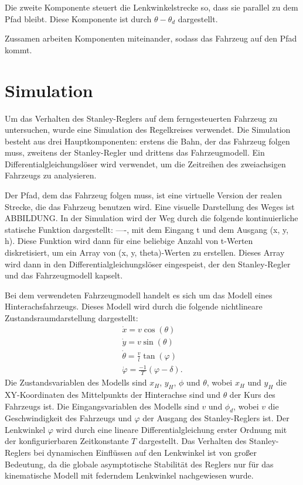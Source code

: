 \documentclass[arbeit=studie,oneside,BCOR=12mm]{ArbeitRST}
\begin{document}
Die zweite Komponente steuert die Lenkwinkelstrecke so, dass sie parallel zu
dem Pfad bleibt. Diese Komponente ist durch $\theta - \theta_d$ dargestellt.

Zussamen arbeiten Komponenten miteinander, sodass das Fahrzeug auf den Pfad
kommt. 







\section{Simulation}


Um das Verhalten des Stanley-Reglers auf dem ferngesteuerten Fahrzeug zu 
untersuchen, wurde eine Simulation des Regelkreises verwendet.
Die Simulation besteht aus drei Hauptkomponenten: erstens die Bahn, der das 
Fahrzeug folgen muss, zweitens der Stanley-Regler und drittens das 
Fahrzeugmodell. Ein Differentialgleichungslöser wird verwendet, um die 
Zeitreihen des zweiachsigen Fahrzeugs zu analysieren. 

Der Pfad, dem das Fahrzeug folgen muss, ist eine virtuelle Version der realen 
Strecke, die das Fahrzeug benutzen wird. Eine visuelle Darstellung des Weges 
ist ABBILDUNG. In der Simulation wird der Weg durch die folgende kontinuierliche
statische Funktion dargestellt:
----, 
mit dem Eingang t und dem Ausgang (x, y, h). Diese Funktion wird dann für eine 
beliebige Anzahl von t-Werten diskretisiert, um ein Array von 
(x, y, theta)-Werten zu erstellen. Dieses Array wird dann in den 
Differentialgleichungslöser eingespeist, der den Stanley-Regler und das 
Fahrzeugmodell kapselt. 

Bei dem verwendeten Fahrzeugmodell handelt es sich um das Modell eines 
Hinterachsfahrzeugs. Dieses Modell wird durch die folgende nichtlineare 
Zustandsraumdarstellung dargestellt:
\begin{gather}
    \dot{x} = v \cos(\theta) \\
    \dot{y} = v \sin(\theta) \\
    \dot{\theta} = \frac{v}{l}\tan(\varphi) \\
    \dot{\varphi} = \frac{-1}{T}\left(\varphi - \delta\right).
\end{gather}
Die Zustandsvariablen des Modells sind $x_H$, $y_H$, $\phi$ und $\theta$, wobei
$x_H$ und $y_H$ die XY-Koordinaten des Mittelpunkts der Hinterachse sind und
$\theta$ der Kurs des Fahrzeugs ist. Die Eingangsvariablen des Modells sind $v$
und $\phi_d$, wobei $v$ die Geschwindigkeit des Fahrzeugs und $\varphi$ der
Ausgang des Stanley-Reglers ist. Der Lenkwinkel $\varphi$ wird durch eine
lineare Differentialgleichung erster Ordnung mit der konfigurierbaren
Zeitkonstante $T$ dargestellt. Das Verhalten des Stanley-Reglers bei
dynamischen Einflüssen auf den Lenkwinkel ist von großer Bedeutung, da die
globale asymptotische Stabilität des Reglers nur für das kinematische Modell
mit federndem Lenkwinkel nachgewiesen wurde. 
\end{document}
